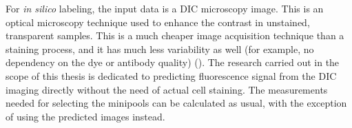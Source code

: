 For \textit{in silico} labeling, the input data is a DIC microscopy image. This is an optical microscopy technique used to enhance the contrast in unstained, transparent samples. This is a much cheaper image acquisition technique than a staining process, and it has much less variability as well (for example, no dependency on the dye or antibody quality) (\cite{Christiansen_2018}). The research carried out in the scope of this thesis is dedicated to predicting fluorescence signal from the DIC imaging directly without the need of actual cell staining. The measurements needed for selecting the minipools can be calculated as usual, with the exception of using the predicted images instead.
